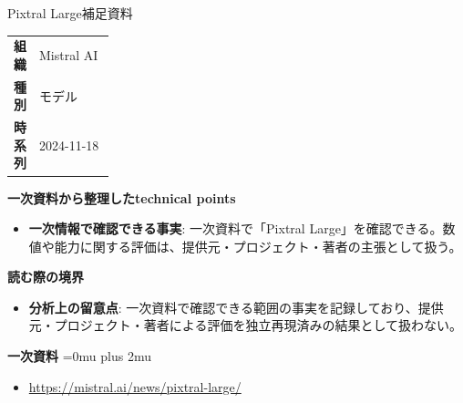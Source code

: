 \begin{technicalnote}{Pixtral Large}{補足資料}
\begingroup
\begin{tabularx}{\linewidth}{@{}>{\bfseries}p{0.22\linewidth}X@{}}
組織 & Mistral AI \\
種別 & モデル \\
時系列 & 2024-11-18 \\
\end{tabularx}
\smallskip
{\bfseries 一次資料から整理したtechnical points}
\begin{itemize}[leftmargin=1.5em,itemsep=0.35em]
\item \textbf{一次情報で確認できる事実}: 一次資料で「Pixtral Large」を確認できる。数値や能力に関する評価は、提供元・プロジェクト・著者の主張として扱う。
\end{itemize}
\begin{minipage}{\linewidth}
{\bfseries 読む際の境界}
\begin{itemize}[leftmargin=1.5em,itemsep=0.35em]
\item \textbf{分析上の留意点}: 一次資料で確認できる範囲の事実を記録しており、提供元・プロジェクト・著者による評価を独立再現済みの結果として扱わない。
\end{itemize}
\begin{samepage}
{\bfseries 一次資料}
\begingroup\sloppy
\Urlmuskip=0mu plus 2mu\relax
\begin{itemize}[leftmargin=1.5em,itemsep=0.25em]
\item {\scriptsize\url{https://mistral.ai/news/pixtral-large/}}
\end{itemize}
\endgroup
\end{samepage}
\end{minipage}
\endgroup
\end{technicalnote}
\medskip
